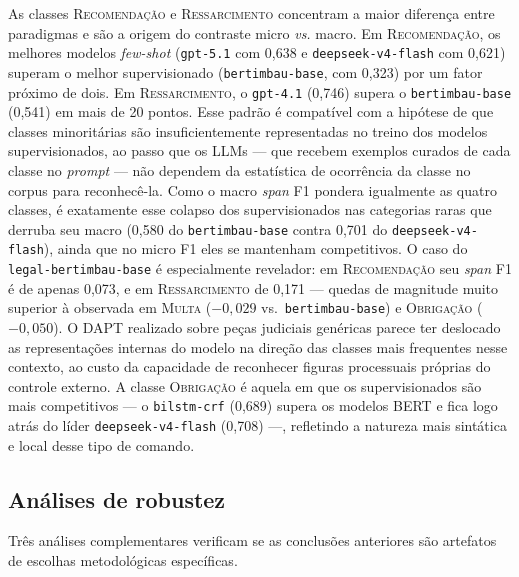 As classes \textsc{Recomendação} e \textsc{Ressarcimento} concentram a maior diferença entre paradigmas e são a origem do contraste micro \textit{vs.} macro. Em \textsc{Recomendação}, os melhores modelos \textit{few-shot} (\texttt{gpt-5.1} com 0,638 e \texttt{deepseek-v4-flash} com 0,621) superam o melhor supervisionado (\texttt{bertimbau-base}, com 0,323) por um fator próximo de dois. Em \textsc{Ressarcimento}, o \texttt{gpt-4.1} (0,746) supera o \texttt{bertimbau-base} (0,541) em mais de 20 pontos. Esse padrão é compatível com a hipótese de que classes minoritárias são insuficientemente representadas no treino dos modelos supervisionados, ao passo que os LLMs --- que recebem exemplos curados de cada classe no \textit{prompt} --- não dependem da estatística de ocorrência da classe no corpus para reconhecê-la. Como o macro \textit{span} F1 pondera igualmente as quatro classes, é exatamente esse colapso dos supervisionados nas categorias raras que derruba seu macro (0,580 do \texttt{bertimbau-base} contra 0,701 do \texttt{deepseek-v4-flash}), ainda que no micro F1 eles se mantenham competitivos. O caso do \texttt{legal-bertimbau-base} é especialmente revelador: em \textsc{Recomendação} seu \textit{span} F1 é de apenas 0,073, e em \textsc{Ressarcimento} de 0,171 --- quedas de magnitude muito superior à observada em \textsc{Multa} ($-0{,}029$ vs.\ \texttt{bertimbau-base}) e \textsc{Obrigação} ($-0{,}050$). O DAPT realizado sobre peças judiciais genéricas parece ter deslocado as representações internas do modelo na direção das classes mais frequentes nesse contexto, ao custo da capacidade de reconhecer figuras processuais próprias do controle externo. A classe \textsc{Obrigação} é aquela em que os supervisionados são mais competitivos --- o \texttt{bilstm-crf} (0,689) supera os modelos BERT e fica logo atrás do líder \texttt{deepseek-v4-flash} (0,708) ---, refletindo a natureza mais sintática e local desse tipo de comando.

\subsection{Análises de robustez}
\label{subsec:robustez}

Três análises complementares verificam se as conclusões anteriores são artefatos de escolhas metodológicas específicas.

